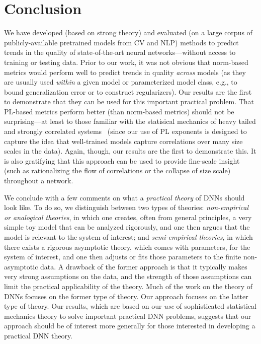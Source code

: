 \vspace{-1mm}
\section{Conclusion}
\label{sxn:conc}

We have developed (based on strong theory) and evaluated (on a large corpus of publicly-available pretrained models from CV and NLP) methods to predict trends in the quality of state-of-the-art neural networks---without access to training or testing data.
Prior to our work, it was not obvious that norm-based metrics would perform well to predict trends in quality \emph{across} models (as they are usually used \emph{within} a given model or parameterized model class, e.g., to bound generalization error or to construct regularizers).
Our results are the first to demonstrate that they can be used for this important practical problem.
That PL-based metrics perform better (than norm-based metrics) should not be surprising---at least to those familiar with the statisical mechanics of heavy tailed and strongly correlated systems~\cite{BouchaudPotters03, SornetteBook, BP11, bun2017} (since our use of PL exponents is designed to capture the idea that well-trained models capture correlations over many size scales in the data).
Again, though, our results are the first to demonstrate this.
It is also gratifying that this approach can be used to provide fine-scale insight (such as rationalizing the flow of correlations or the collapse of size scale) throughout a network. 

We conclude with a few comments on what a \emph{practical theory} of DNNs should look like.
To do so, we distinguish between two types of theories:
\emph{non-empirical or analogical theories}, in which one creates, often from general principles, a very simple toy model that can be analyzed rigorously, and one then argues that the model is relevant to the system of interest; and 
\emph{semi-empirical theories}, in which there exists a rigorous asymptotic theory, which comes with parameters, for the system of interest, and one then adjusts or fits those parameters to the finite non-asymptotic data.
A drawback of the former approach is that it typically makes very strong assumptions on the data, and the strength of those assumptions can limit the practical applicability of the theory.
Much of the work on the theory of DNNs focuses on the former type of theory.
Our approach focuses on the latter type of theory.
Our results, which are based on our \emph{use} of sophisticated statistical mechanics theory to solve important practical DNN problems, suggests that our approach should be of interest more generally for those interested in developing a practical DNN theory.


